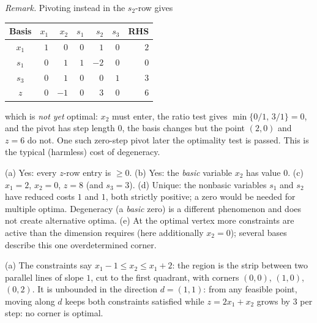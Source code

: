 \begin{solutions}
        \emph{Remark.} Pivoting instead in the $s_2$-row gives
        \begin{center}
        \begin{tabular}{c|rrrrr|r}
        \hline
        Basis & $x_1$ & $x_2$ & $s_1$ & $s_2$ & $s_3$ & RHS\\
        \hline
        $x_1$ & $1$ & $0$ & $0$ & $1$ & $0$ & $2$\\
        $s_1$ & $0$ & $1$ & $1$ & $-2$ & $0$ & $0$\\
        $s_3$ & $0$ & $1$ & $0$ & $0$ & $1$ & $3$\\
        \hline
        $z$ & $0$ & $-1$ & $0$ & $3$ & $0$ & $6$\\
        \hline
        \end{tabular}
        \end{center}
        which is \emph{not yet} optimal: $x_2$ must enter, the ratio test
        gives $\min\{0/1,\,3/1\}=0$, and the pivot has step length $0$,
        the basis changes but the point $(2,0)$ and $z=6$ do not. One such
        zero-step pivot later the optimality test is passed. This is the
        typical (harmless) cost of degeneracy.

  \item (a) Yes: every $z$-row entry is $\ge 0$.
        (b) Yes: the \emph{basic} variable $x_2$ has value $0$.
        (c) $x_1=2$, $x_2=0$, $z=8$ (and $s_3=3$).
        (d) Unique: the nonbasic variables $s_1$ and $s_2$ have reduced
        costs $1$ and $1$, both strictly positive; a zero would be needed
        for multiple optima. Degeneracy (a \emph{basic} zero) is a
        different phenomenon and does not create alternative optima.
        (e) At the optimal vertex more constraints are active than the
        dimension requires (here additionally $x_2=0$); several bases
        describe this one overdetermined corner.

  \item (a) The constraints say $x_1-1\le x_2\le x_1+2$: the region is the
        strip between two parallel lines of slope $1$, cut to the first
        quadrant, with corners $(0,0)$, $(1,0)$, $(0,2)$. It is unbounded
        in the direction $d=(1,1)$: from any feasible point, moving along
        $d$ keeps both constraints satisfied while
        $z=2x_1+x_2$ grows by $3$ per step: no corner is optimal.


\end{solutions}
